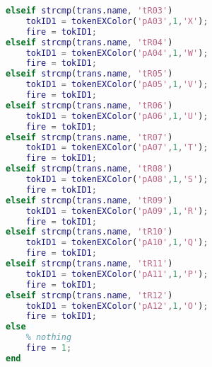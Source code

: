 \begin{lstlisting}[language=MATLAB, caption=COMMON\_PRE.m]
elseif strcmp(trans.name, 'tR03')
    tokID1 = tokenEXColor('pA03',1,'X');
    fire = tokID1;
elseif strcmp(trans.name, 'tR04')
    tokID1 = tokenEXColor('pA04',1,'W');
    fire = tokID1;
elseif strcmp(trans.name, 'tR05')
    tokID1 = tokenEXColor('pA05',1,'V');
    fire = tokID1;
elseif strcmp(trans.name, 'tR06')
    tokID1 = tokenEXColor('pA06',1,'U');
    fire = tokID1;
elseif strcmp(trans.name, 'tR07')
    tokID1 = tokenEXColor('pA07',1,'T');
    fire = tokID1;
elseif strcmp(trans.name, 'tR08')
    tokID1 = tokenEXColor('pA08',1,'S');
    fire = tokID1;
elseif strcmp(trans.name, 'tR09')
    tokID1 = tokenEXColor('pA09',1,'R');
    fire = tokID1;
elseif strcmp(trans.name, 'tR10')
    tokID1 = tokenEXColor('pA10',1,'Q');
    fire = tokID1;
elseif strcmp(trans.name, 'tR11')
    tokID1 = tokenEXColor('pA11',1,'P');
    fire = tokID1;
elseif strcmp(trans.name, 'tR12')
    tokID1 = tokenEXColor('pA12',1,'O');
    fire = tokID1;
else
    % nothing
    fire = 1;
end
\end{lstlisting}


